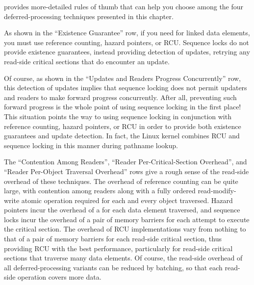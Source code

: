provides more-detailed rules of thumb that can help you choose among the
four deferred-processing techniques presented in this chapter.

As shown in the ``Existence Guarantee'' row,
if you need  for linked
data elements, you must use reference counting, hazard pointers, or RCU\@.
Sequence locks do not provide existence guarantees, instead providing
detection of updates, retrying any read-side critical sections
that do encounter an update.

Of course, as shown in the ``Updates and Readers Progress Concurrently''
row, this detection of updates implies
that sequence locking does not permit updaters and readers to make forward
progress concurrently.
After all, preventing such forward progress is the whole point of using
sequence locking in the first place!
This situation points the way to using sequence locking in conjunction
with reference counting, hazard pointers, or RCU in order to provide
both existence guarantees and update detection.
In fact, the Linux kernel combines RCU and sequence locking in
this manner during pathname lookup.

The ``Contention Among Readers'', ``Reader Per-Critical-Section Overhead'',
and ``Reader Per-Object Traversal Overhead'' rows give a rough sense of
the read-side overhead of these techniques.
The overhead of reference counting can be quite large, with
contention among readers along with a fully ordered read-modify-write
atomic operation required for each and every object traversed.
Hazard pointers incur the overhead of a 
for each data element
traversed, and sequence locks incur the overhead of a pair of memory barriers
for each attempt to execute the critical section.
The overhead of RCU implementations vary from nothing to that of a pair of
memory barriers for each read-side critical section, thus providing RCU
with the best performance, particularly for read-side critical sections
that traverse many data elements.
Of course, the read-side overhead of all deferred-processing variants can
be reduced by batching, so that each read-side operation covers more data.

